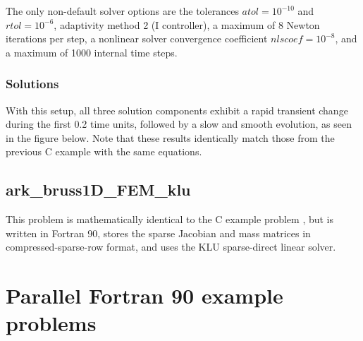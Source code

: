 \documentclass[letterpaper,10pt,english]{sphinxmanual}
\begin{document}
The only non-default solver options are the tolerances
\(atol=10^{-10}\) and \(rtol=10^{-6}\), adaptivity method 2 (I
controller), a maximum of 8 Newton iterations per step, a nonlinear
solver convergence coefficient \(nlscoef=10^{-8}\), and a maximum
of 1000 internal time steps.


\subsection{Solutions}
\label{\detokenize{f90_serial:solutions}}
With this setup, all three solution components exhibit a rapid
transient change during the first 0.2 time units, followed by a slow
and smooth evolution, as seen in the figure below.  Note that these
results identically match those from the previous C example with the
same equations.

\begin{figure}[htbp]
\centering

\noindent{}
\end{figure}


\section{ark\_bruss1D\_FEM\_klu}
\label{\detokenize{f90_serial:ark-bruss1d-fem-klu}}\label{\detokenize{f90_serial:id2}}
This problem is mathematically identical to the C example problem
{\hyperref[\detokenize{c_serial:ark-brusselator1d-fem-slu}]{}}, but is written in Fortran 90, stores
the sparse Jacobian and mass matrices in compressed-sparse-row format,
and uses the KLU sparse-direct linear solver.


\chapter{Parallel Fortran 90 example problems}
\label{\detokenize{f90_parallel::doc}}\label{\detokenize{f90_parallel:parallel-f90}}\label{\detokenize{f90_parallel:parallel-fortran-90-example-problems}}
\end{document}
